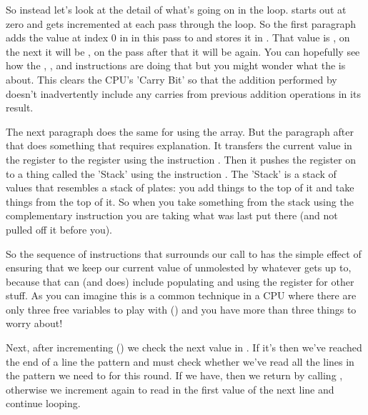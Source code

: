 {So instead let's look at the detail of what's going on in the loop.  starts out at zero and gets incremented at
each pass through the loop. So the first paragraph adds the value at index 0 in  in this pass to 
and stores it in . That value is , on the next it will be , on the pass after that
it will be  again. You can hopefully see how the , , and  instructions are doing that
but you might wonder what the  is about. This clears the CPU's 'Carry Bit' so that the addition performed by 
doesn't inadvertently include any carries from previous addition operations in its result.

The next paragraph does the same for  using the  array. But the paragraph after
that does something that requires explanation. It transfers the current value in the  register to the  register
using the instruction . Then it pushes the  register on to a thing called the 'Stack' using the instruction
. The 'Stack' is a stack of values that resembles a stack of plates: you add things to the top of it and take things
from the top of it. So when you take something from the stack using the complementary instruction  you are taking
what was last put there (and not pulled off it before you).

So the  sequence of instructions that surrounds our call to  has the
simple effect of ensuring that we keep our current value of  unmolested by whatever 
gets up to, because that can (and does) include populating and using the  register for other stuff. As you can imagine
this is a common technique in a CPU where there are only three free variables to play with () and you have more than three things
to worry about!

Next, after incrementing  () we check the next value in . If it's  then
we've reached the end of a line the pattern and must check whether we've read all the lines in the pattern we need to for this
round. If we have, then we return by calling , otherwise we increment  again to read
in the first value of the next line and continue looping.

}
